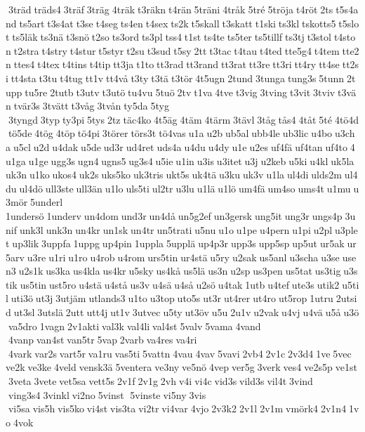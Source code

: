  3träd träds4 3träf 3träg 4träk t3räkn t4rän 5träni 4tråk 5tré 5tröja t4röt 2ts t5s4and ts5art t3s4at t3se t4seg ts4en t4sex ts2k t5skall t3skatt t1ski ts3kl tskotts5 t5slot ts5läk ts3nä t3snö t2so ts3ord ts3pl tss4 t1st ts4te ts5ter ts5tillf ts3tj t3stol t4ston t2stra t4stry t4stur t5styr t2su t3sud t5sy 2tt t3tac t4tau t4ted tte5g4 t4tem tte2n ttes4 t4tex t4tins t4tip tt3ja t1to tt3rad tt3rand tt3rat tt3re tt3ri tt4ry tt4se tt2si tt4sta t3tu t4tug tt1v tt4vå t3ty t3tä t3tör 4t5ugn 2tund 3tunga tung3s 5tunn 2tupp tu5re 2tutb t3utv t3utö tu4vu 5tuö 2tv t1va 4tve t3vig 3tving t3vit 3tviv t3vän tvär3s 3tvätt t3våg 3tvån ty5da 5tyg  3tyngd 3typ ty3pi 5tys 2tz täc4ko 4t5äg 4täm 4tärm 3tävl 3tåg tås4 4tåt 5té 4tö4d tö5de 4tög 4töp tö4pi 3törer törs3t tö4vas u1a u2b ub5al ubb4le ub3lic u4bo u3cha u5cl u2d u4dak u5de ud3r ud4ret uds4a u4du u4dy u1e u2es uf4fä uf4tan uf4to 4u1ga u1ge ugg3s ugn4 ugns5 ug3s4 u5ie u1in u3is u3itet u3j u2keb u5ki u4kl uk5la uk3n u1ko ukos4 uk2s uks5ko uk3tris ukt5s uk4tä u3ku uk3v u1la ul4di ulds2m ul4du ul4dö ull3ste ull3än u1lo uls5ti ul2tr u3lu u1lä u1lö um4fä um4so ums4t u1mu u3mör 5underl 	1undersö 1underv un4dom und3r un4då un5g2ef un3gersk ung5it ung3r ungs4p 3unif unk3l unk3n un4kr un1sk un4tr un5trati u5nu u1o u1pe u4pern u1pi u2pl u3plet up3lik 3uppfa 1uppg up4pin 1uppla 5upplä up4p3r upp3s upp5sp up5ut ur5ak ur5arv u3re u1ri u1ro u4rob u4rom urs5tin ur4stä u5ry u2sak us5anl u3scha u3se usen3 u2s1k us3ka us4kla us4kr u5sky us4kå us5lä us3n u2sp us3pen us5tat us3tig u3stik us5tin ust5ro u4stä u4stå us3v u4sä u4så u2sö u4tak 1utb u4tef ute3s utik2 u5til uti3ö ut3j 3utjäm utlands3 u1to u3top uto5s ut3r ut4rer ut4ro ut5rop 1utru 2utsid ut3sl 3utslä 2utt utt4j ut1v 3utvec u5ty ut3öv u5u 2u1v u2vak u4vj u4vä u5å u3ö va5dro 1vagn 2v1akti val3k val4li val4st 5valv 5vama 4vand  4vanp van4st van5tr 5vap 2varb va4res va4ri  4vark var2s vart5r va1ru vas5ti 5vattn 4vau 4vav 5vavi 2vb4 2v1c 2v3d4 1ve 5vec ve2k ve3ke 4veld vensk3ä 5ventera ve3ny ve5nö 4vep ver5g 3verk ves4 ve2s5p ve1st 3veta 3vete vet5sa vett5s 2v1f 2v1g 2vh v4i vi4c vid3s vild3s vil4t 3vind  ving3s4 3vinkl vi2no 5vinst  5vinste vi5ny 3vis  vi5sa vis5h vis5ko vi4st vis3ta vi2tr vi4var 4vjo 2v3k2 2v1l 2v1m vmörk4 2v1n4 1vo 4vok 